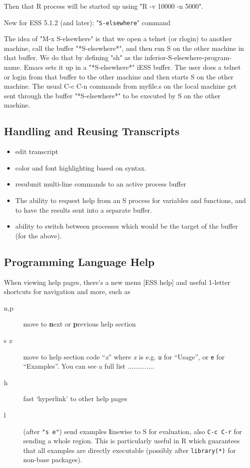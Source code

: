 \documentclass{article}
\begin{document}
Then that R process will be started up using "R -v 10000 -n 5000".


New for ESS 5.1.2 (and later):  "\texttt{S-elsewhere}" command

  The idea of "M-x S-elsewhere" is that we open a telnet (or rlogin)
  to another machine, call the buffer "*S-elsewhere*", and then run S
  on the other machine in that buffer.  We do that by defining "sh" as
  the inferior-S-elsewhere-program-name.  Emacs sets it up in a
  "*S-elsewhere*" iESS buffer.  The user does a telnet or login from
  that buffer to the other machine and then starts S on the other
  machine.  The usual C-c C-n commands from myfile.s on the local
  machine get sent through the buffer "*S-elsewhere*" to be executed
  by S on the other machine.
                           

\subsection{Handling and Reusing Transcripts}
\label{sec:S:trans}

\begin{itemize}
\item  edit transcript 
\item  color and font highlighting based on syntax. 
\item  resubmit multi-line commands to an active process buffer 
\item  The ability to request help from an S process for variables and 
        functions, and to have the results sent into a separate buffer. 
\item  ability to switch between processes which would be the target of the  
  buffer (for the above). 
\end{itemize}

\subsection{Programming Language Help}
\label{sec:S:help}
When viewing help pages, there's a new menu \textsf{[ESS help]} and
useful 1-letter shortcuts for navigation and more, such as
\begin{description}
\item[n,p] move to \textbf{n}ext or \textbf{p}revious help section
\item[s \textit{x}] move to help section code ``\textit{x}'' where
  \textit{x} is e.g. \texttt{u} for ``Usage'', or \texttt{e} for
  ``Examples''.  You can see a full list ..............

\item[h] fast `hyperlink' to other help pages

\item[l] (after \texttt{"s e"}) send examples \textbf{l}inewise to S for
  evaluation, also \texttt{C-c C-r} for sending a whole region.  This 
  is particularly useful in R which guarantees that all examples are
  directly executable (possibly after \texttt{library(*)} for non-base
  packages).
\end{description}
\end{document}
